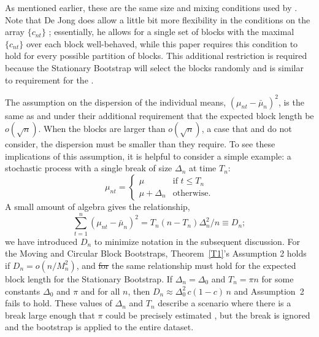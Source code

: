 \documentclass[11pt]{article}
\providecommand{\DIFadd}[1]{{\protect\color{blue}\uwave{#1}}} %
\providecommand{\DIFdel}[1]{{\protect\color{red}\sout{#1}}}                      %
\providecommand{\DIFaddbegin}{} %
\providecommand{\DIFaddend}{} %
\providecommand{\DIFdelbegin}{} %
\providecommand{\DIFdelend}{} %
\begin{document}
As mentioned earlier, these are the same size and mixing conditions
used by \citet{Jon:97}.
Note that De Jong does allow a little bit more flexibility in the
conditions on the array $\{c_{nt}\}$ \citep[see also][]{Dav:93};
essentially, he allows for a single set of blocks with the
maximal $\{c_{nt}\}$ over each block well-behaved, while this
paper requires this condition to hold for every possible partition of
blocks.  This additional restriction is required because the
Stationary Bootstrap will select the blocks randomly and is similar to
 requirement for the \fclt.

The assumption on the dispersion of the individual means,
$(\mu_{nt} - \bar\mu_n)^2$, is the same as  and
 under their additional requirement that the
expected block length be $o(\sqrt{n})$. When
the blocks are larger than $o(\sqrt{n})$, a case that \citet{GoW:02}
and \citet{GoJ:03} do not consider, the dispersion must be smaller
than they require.
To see these implications of this assumption, it is helpful to
consider a simple example: a stochastic process with a single break of
size $\Delta_n$ at time $T_n$:
\begin{equation*}
\mu_{nt} =
\begin{cases}
  \mu & \text{if } t \leq T_n \\
  \mu + \Delta_n & \text{otherwise}.
\end{cases}
\end{equation*}
A small amount of algebra gives the relationship,
\begin{equation*}
  \sum_{t=1}^n (\mu_{nt} - \bar \mu_n)^2
  = T_n (n - T_n) \Delta_n^2 / n \equiv D_n;
\end{equation*}
we have introduced $D_n$ to minimize notation in the subsequent
discussion.  For the Moving and Circular Block Bootstraps,
Theorem~\ref{T1}'s Assumption 2 holds if $D_n = o(n / M_n^2)$, and
\DIFdelbegin \DIFdel{for
}\DIFdelend the same relationship must hold for the expected block length for the
Stationary Bootstrap. If $\Delta_n = \Delta_0$ and $T_n = \pi n$ for
some constants $\Delta_0$ and $\pi$ and for all $n$, then
$D_n \approx \Delta_0^2 \,$\DIFdelbegin \DIFdel{$c (1 - c)$}\DIFdelend \DIFaddbegin \DIFadd{$\pi (1 - \pi)$}\DIFaddend$\, n$ and Assumption~2 fails to
hold. These values of $\Delta_n$ and $T_n$ describe a scenario where
there is a break large enough that $\pi$ could be precisely
estimated \citep[as in][]{Bai:94}, but the break is ignored and the
bootstrap is applied to the entire dataset.
\end{document}
